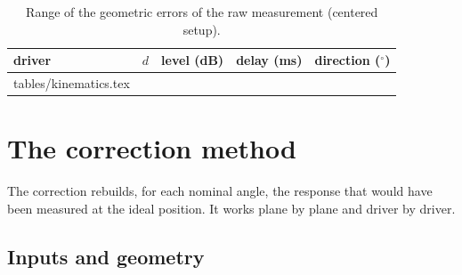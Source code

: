\documentclass[11pt,a4paper]{article}
\makeatletter
\newcommand{\rows}[1]{\@@input tables/#1.tex }
\makeatother
\begin{document}
\begin{table}[tbp]
  \centering
  \caption{Range of the geometric errors of the raw measurement (centered setup).}
  \label{tab:kinematics}
  \begin{tabular}{llccc}
    \toprule
    driver & $d$ & level (dB) & delay (ms) & direction ($^\circ$) \\
    \midrule
    \rows{kinematics}
    \bottomrule
  \end{tabular}
\end{table}

\section{The correction method}

The correction rebuilds, for each nominal angle, the response that would have been measured at
the ideal position. It works plane by plane and driver by driver.

\subsection{Inputs and geometry}
\end{document}
